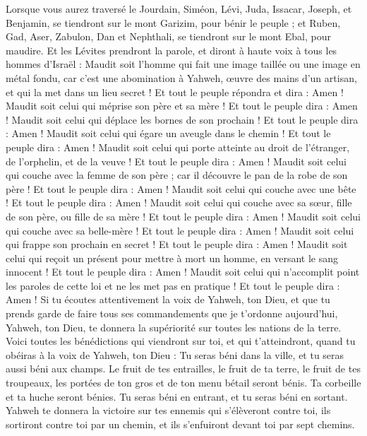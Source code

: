 \begin{multicols}{2}
Lorsque vous aurez traversé le Jourdain, Siméon, Lévi, Juda, Issacar, Joseph, et Benjamin, se tiendront sur le mont Garizim, pour bénir le peuple ;
et Ruben, Gad, Aser, Zabulon, Dan et Nephthali, se tiendront sur le mont Ebal, pour maudire.
Et les Lévites prendront la parole, et diront à haute voix à tous les hommes d'Israël :
Maudit soit l'homme qui fait une image taillée ou une image en métal fondu, car c'est une abomination à Yahweh, œuvre des mains d'un artisan, et qui la met dans un lieu secret ! Et tout le peuple répondra et dira : Amen !
Maudit soit celui qui méprise son père et sa mère ! Et tout le peuple dira : Amen !
Maudit soit celui qui déplace les bornes de son prochain ! Et tout le peuple dira : Amen !
Maudit soit celui qui égare un aveugle dans le chemin ! Et tout le peuple dira : Amen !
Maudit soit celui qui porte atteinte au droit de l'étranger, de l'orphelin, et de la veuve ! Et tout le peuple dira : Amen !
Maudit soit celui qui couche avec la femme de son père ; car il découvre le pan de la robe de son père ! Et tout le peuple dira : Amen !
Maudit soit celui qui couche avec une bête ! Et tout le peuple dira : Amen !
Maudit soit celui qui couche avec sa sœur, fille de son père, ou fille de sa mère ! Et tout le peuple dira : Amen !
Maudit soit celui qui couche avec sa belle-mère ! Et tout le peuple dira : Amen !
Maudit soit celui qui frappe son prochain en secret ! Et tout le peuple dira : Amen !
Maudit soit celui qui reçoit un présent pour mettre à mort un homme, en versant le sang innocent ! Et tout le peuple dira : Amen !
Maudit soit celui qui n’accomplit point les paroles de cette loi et ne les met pas en pratique ! Et tout le peuple dira : Amen !
\VerseOne{}Si tu écoutes attentivement la voix de Yahweh, ton Dieu, et que tu prends garde de faire tous ses commandements que je t’ordonne aujourd'hui, Yahweh, ton Dieu, te donnera la supériorité sur toutes les nations de la terre.
Voici toutes les bénédictions qui viendront sur toi, et qui t'atteindront, quand tu obéiras à la voix de Yahweh, ton Dieu :
Tu seras béni dans la ville, et tu seras aussi béni aux champs.
Le fruit de tes entrailles, le fruit de ta terre, le fruit de tes troupeaux, les portées de ton gros et de ton menu bétail seront bénis.
Ta corbeille et ta huche seront bénies.
Tu seras béni en entrant, et tu seras béni en sortant.
Yahweh te donnera la victoire sur tes ennemis qui s'élèveront contre toi, ils sortiront contre toi par un chemin, et ils s'enfuiront devant toi par sept chemins.

\end{multicols}
